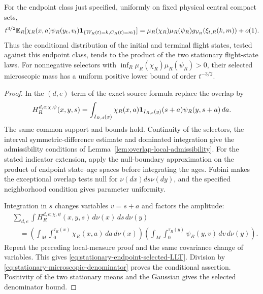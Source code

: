 \begin{theorem}
\label{thm:stationary-endpoint-selected-LLT}
For the endpoint class just specified, uniformly on fixed physical
central compact sets,
\begin{align}
 t^{3/2}\mathbb E_R[\chi_R(x,a)\psi_R(y_t,v_t)
             \one_{\{W_R(t)=k,C_R(t)=m\}}]
 =\mu_R(\chi_R)\mu_R(\psi_R)
            g_{\mathcal V_R}(\xi_{t,R}(k,m))+o(1).
 \label{eq:stationary-endpoint-selected-LLT}
\end{align}
Thus the conditional distribution of the initial and terminal flight
states, tested against this endpoint class, tends to the product of
the two stationary flight-state laws. For nonnegative selectors with
$\inf_R\mu_R(\chi_R)\mu_R(\psi_R)>0$, their selected microscopic
mass has a uniform positive lower bound of order $t^{-3/2}$.
\end{theorem}
\begin{proof}
In the $(d,e)$ term of the exact source formula replace the overlap by
\[
 H_R^{d,e;\chi,\psi}(x,y,s)=
 \int_{I_{R,d}(x)}\chi_R(x,a)
        \mathbf1_{I_{R,e}(y)}(s+a)\psi_R(y,s+a)\,da.
\]
The same common support and bounds hold. Continuity of the selectors,
the interval symmetric-difference estimate and dominated integration
give the admissibility conditions of
Lemma~\ref{lem:overlap-local-admissibility}. For the stated indicator
extension, apply the null-boundary approximation on the product of
endpoint state--age spaces before integrating the ages. Fubini makes
the exceptional overlap tests null for $\nu(dx)ds\nu(dy)$, and the
specified neighborhood condition gives parameter uniformity.

Integration in $s$ changes variables $v=s+a$ and factors the amplitude:
\begin{align*}
 &\sum_{d,e}\int H_R^{d,e;\chi,\psi}(x,y,s)
                           \,d\nu(x)\,ds\,d\nu(y)\\
 &\quad=\left(\int_M\int_0^{\tau_R(x)}\chi_R(x,a)\,da\,d\nu(x)\right)
   \left(\int_M\int_0^{\tau_R(y)}\psi_R(y,v)\,dv\,d\nu(y)\right).
\end{align*}
Repeat the preceding local-measure proof and the same covariance change
of variables. This gives \eqref{eq:stationary-endpoint-selected-LLT}.
Division by \eqref{eq:stationary-microscopic-denominator} proves the
conditional assertion. Positivity of the two stationary means and the
Gaussian gives the selected denominator bound.
\end{proof}

